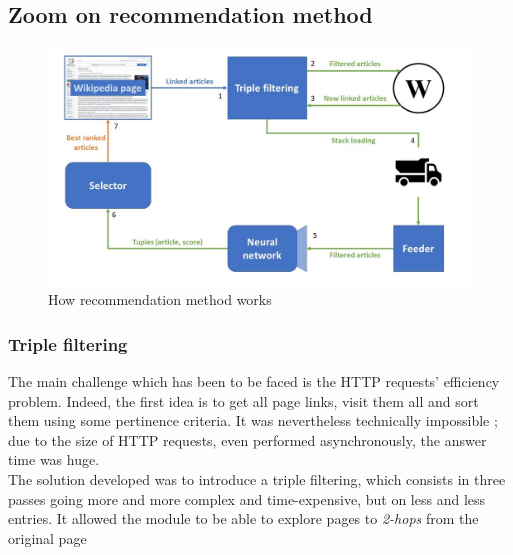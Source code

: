 \documentclass[11pt]{article}
\theoremstyle{plain}
\theoremstyle{definition}
\theoremstyle{remark}
\begin{document}
\subsection{Zoom on recommendation method}

\begin{figure}[h!]
	\centering
    \includegraphics[width=400pt]{diagram_zoom.png}
    \caption{How recommendation method works}
    \label{arch_glo}
\end{figure}

\subsubsection{Triple filtering}

The main challenge which has been to be faced is the HTTP requests' efficiency problem. Indeed, the first idea is to get all page links, visit them all and sort them using some pertinence criteria. It was nevertheless technically impossible ; due to the size of HTTP requests, even performed asynchronously, the answer time was huge. \\

The solution developed was to introduce a triple filtering, which consists in three passes going more and more complex and time-expensive, but on less and less entries. It allowed the module to be able to explore pages to \textit{2-hops} from the original page
\end{document}

